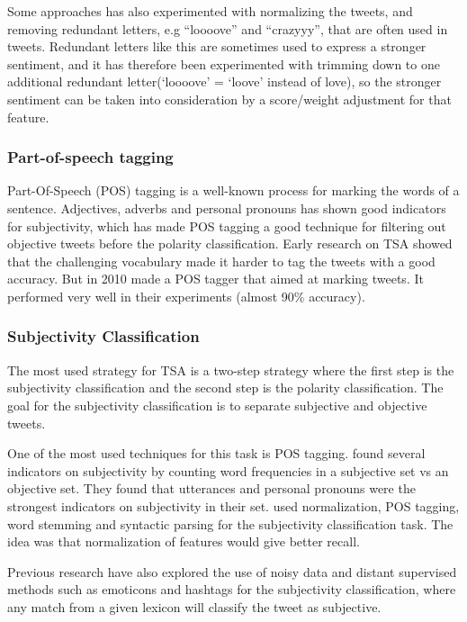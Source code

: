 Some approaches has also experimented with normalizing the tweets, and removing redundant letters, e.g “loooove” and “crazyyy”, that are often used in tweets. Redundant letters like this are sometimes used to express a stronger sentiment, and it has therefore been experimented with trimming down to one additional redundant letter(‘loooove’ = ‘loove’ instead of love), so the stronger sentiment can be taken into consideration by a score/weight adjustment for that feature.

\subsubsection*{Part-of-speech tagging}
Part-Of-Speech (POS) tagging is a well-known process for marking the words of a sentence. Adjectives, adverbs and personal pronouns has shown good indicators for subjectivity, which has made POS tagging a good technique for filtering out objective tweets before the polarity classification. Early research on TSA showed that the challenging vocabulary made it harder to tag the tweets with a good accuracy. But in 2010 \cite{article:gimpel} made a POS tagger that aimed at marking tweets. It performed very well in their experiments (almost 90\% accuracy).

\subsubsection*{Subjectivity Classification}
The most used strategy for TSA is a two-step strategy where the first step is the subjectivity classification and the second step is the polarity classification. The goal for the subjectivity classification is to separate subjective and objective tweets.

One of the most used techniques for this task is POS tagging. \cite{article:pak} found several indicators on subjectivity by counting word frequencies in a subjective set vs an objective set. They found that utterances and personal pronouns were the strongest indicators on subjectivity in their set. \cite{article:jiang} used normalization, POS tagging, word stemming and syntactic parsing for the subjectivity classification task. The idea was that normalization of features would give better recall.

Previous research have also explored the use of noisy data and distant supervised methods such as emoticons and hashtags for the subjectivity classification, where any match from a given lexicon will classify the tweet as subjective.

